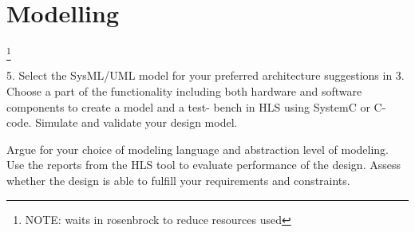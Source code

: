 \section{Modelling}
\footnote{\color{red}NOTE: waits in rosenbrock to reduce resources used}

\begin{framed}
5. Select the SysML/UML model for your preferred architecture suggestions in 3. Choose a part of the functionality including both hardware and software components to create a model and a test- bench in HLS using SystemC or C-code. Simulate and validate your design model.

Argue for your choice of modeling language and abstraction level of modeling. Use the reports from the HLS tool to evaluate performance of the design. Assess whether the design is able to fulfill your requirements and constraints.
\end{framed}



